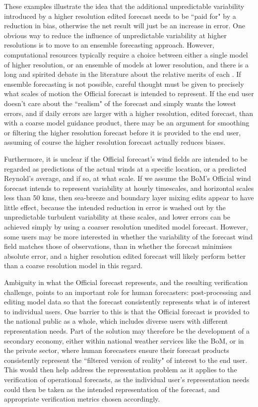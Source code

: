 \documentclass[twocol]{ametsoc}
\begin{document}
These examples illustrate the idea that the additional unpredictable variability introduced by a higher resolution edited forecast needs to be ``paid for" by a reduction in bias, otherwise the net result will just be an increase in error.  One obvious way to reduce the influence of unpredictable variability at higher resolutions is to move to an ensemble forecasting approach. However, computational resources typically require a choice between either a single model of higher resolution, or an ensemble of models at lower resolution, and there is a long and spirited debate in the literature about the relative merits of each \citep{brooks93}. If ensemble forecasting is not possible, careful thought must be given to precisely what scales of motion the Official forecast is intended to represent. If the end user doesn't care about the ``realism" of the forecast and simply wants the lowest errors, and if daily errors are larger with a higher resolution, edited forecast, than with a coarse model guidance product, there may be an argument for smoothing or filtering the higher resolution forecast before it is provided to the end user, assuming of course the higher resolution forecast actually reduces biases. 

Furthermore, it is unclear if the Official forecast's wind fields are intended to be regarded as predictions of the actual winds at a specific location, or a predicted Reynold's average, and if so, at what scale. If we assume the BoM's Official wind forecast intends to represent variability at hourly timescales, and horizontal scales less than 50 kms, then sea-breeze and boundary layer mixing edits appear to have little effect, because the intended reduction in error is washed out by the unpredictable turbulent variability at these scales, and lower errors can be achieved simply by using a coarser resolution unedited model forecast. However, some users may be more interested in whether the variability of the forecast wind field matches those of observations, than in whether the forecast minimises absolute error, and a higher resolution edited forecast will likely perform better than a coarse resolution model in this regard. 

Ambiguity in what the Official forecast represents, and the resulting verification challenge, points to an important role for human forecasters: post-processing and editing model data so that the forecast consistently represents what is of interest to individual users. One barrier to this is that the Official forecast is provided to the national public as a whole, which includes diverse users with different representation needs. Part of the solution may therefore be the development of a secondary economy, either within national weather services like the BoM, or in the private sector, where human forecasters ensure their forecast products consistently represent the ``filtered version of reality" of interest to the end user. This would then help address the representation problem as it applies to the verification of operational forecasts, as the individual user's representation needs could then be taken as the intended representation of the forecast, and appropriate verification metrics chosen accordingly.    
\end{document}
